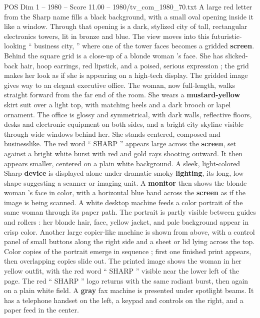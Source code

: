 \begin{textsample}{POS Dim 1 – 1980 – Score 11.00 – 1980/tv\_com\_1980\_70.txt}  \label{ex:f1_pos_051}
A large red letter from the Sharp name fills a black background, with a small oval opening inside it like a window.
Through that opening is a dark, stylized city of tall, rectangular electronics towers, lit in bronze and blue.
The view moves into this futuristic-looking “ business city, ” where one of the tower faces becomes a gridded \textbf{screen}.
Behind the square grid is a close-up of a blonde woman ’s face.
She has slicked-back hair, hoop earrings, red lipstick, and a poised, serious expression ; the grid makes her look as if she is appearing on a high-tech display.
The gridded image gives way to an elegant executive office.
The woman, now full-length, walks straight forward from the far end of the room.
She wears a \textbf{mustard-yellow} skirt suit over a light top, with matching heels and a dark brooch or lapel ornament.
The office is glossy and symmetrical, with dark walls, reflective floors, desks and electronic equipment on both sides, and a bright city skyline visible through wide windows behind her.
She stands centered, composed and businesslike.
The red word “ SHARP ” appears large across the \textbf{screen}, set against a bright white burst with red and gold rays shooting outward.
It then appears smaller, centered on a plain white background.
A sleek, light-colored Sharp \textbf{device} is displayed alone under dramatic smoky \textbf{lighting}, its long, low shape suggesting a scanner or imaging unit.
A \textbf{monitor} then shows the blonde woman ’s face in color, with a horizontal blue band across the \textbf{screen} as if the image is being scanned.
A white desktop machine feeds a color portrait of the same woman through its paper path.
The portrait is partly visible between guides and rollers : her blonde hair, face, yellow jacket, and pale background appear in crisp color.
Another large copier-like machine is shown from above, with a control panel of small buttons along the right side and a sheet or lid lying across the top.
Color copies of the portrait emerge in sequence ; first one finished print appears, then overlapping copies slide out.
The printed image shows the woman in her yellow outfit, with the red word “ SHARP ” visible near the lower left of the page.
The red “ SHARP ” logo returns with the same radiant burst, then again on a plain white field.
A \textbf{gray} fax machine is presented under spotlight beams.
It has a telephone handset on the left, a keypad and controls on the right, and a paper feed in the center.

\end{textsample}
